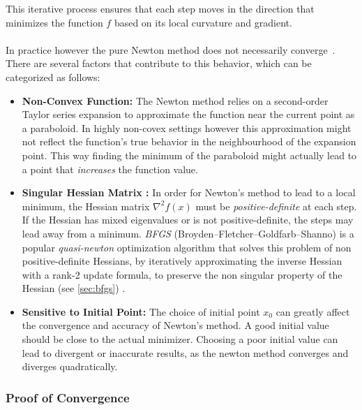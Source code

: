 This iterative process ensures that each step moves in the direction that minimizes the function \( f \) based on its local curvature and gradient.\\\\
In practice however the pure Newton method does not necessarily converge~\cite{nocedal2006numerical}. \\
There are several factors that contribute to this behavior, which can be categorized as follows:
\begin{itemize}
    \item \textbf{Non-Convex Function:} The Newton method relies on a second-order Taylor series expansion to approximate the function near the current point as a paraboloid.
     In highly non-covex settings however this approximation might not reflect the function's true behavior in 
    the neighbourhood of the expansion point. This way finding the minimum of the paraboloid might actually lead to a point that \emph{increases} the function value.\cite{kashyap2023survey}
    \item \textbf{Singular Hessian Matrix :} In order for Newton's method to lead to a local minimum,
     the Hessian matrix \( \nabla^2 f(x) \) must be \emph{positive-definite} at each step.
     If the Hessian has mixed eigenvalues or is not positive-definite, the steps may lead away from a minimum.
     \emph{BFGS} (Broyden–Fletcher–Goldfarb–Shanno) is a popular \emph{quasi-newton} optimization algorithm 
     that solves this problem of non positive-definite Hessians, by iteratively approximating the inverse Hessian with a rank-2 update formula,
      to preserve the non singular property of the Hessian (see \ref{sec:bfgs}) .\cite{nocedal2006numerical}
    \item \textbf{Sensitive to Initial Point:} The choice of initial point $x_0$ can greatly affect the convergence and accuracy of Newton's method. A good initial value should be close to the actual minimizer.
     Choosing a poor initial value can lead to divergent or inaccurate results, as the newton method converges and diverges quadratically.\cite{nocedal2006numerical}
   
\end{itemize}

\subsubsection{Proof of Convergence \cite{yao2021adahessian}}
\label{sec:newton_conv}


